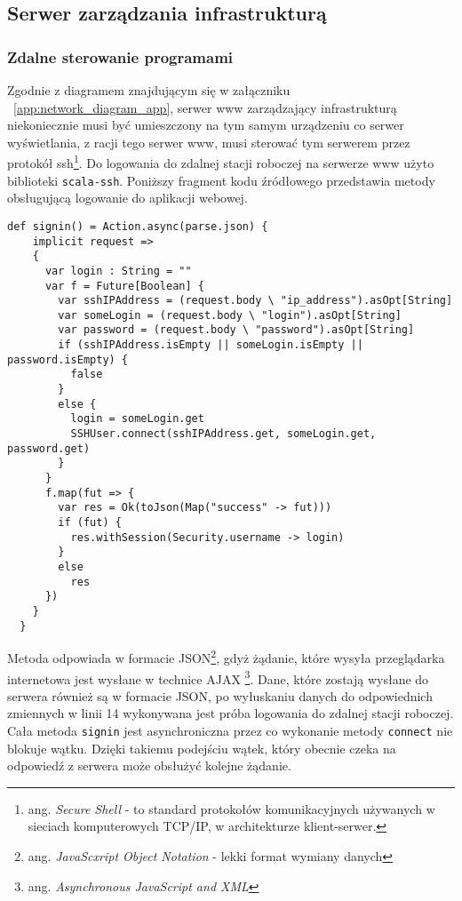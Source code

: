 \subsection{Serwer zarządzania infrastrukturą}

\subsubsection{Zdalne sterowanie programami}

Zgodnie z diagramem znajdującym się w załączniku ~\ref{app:network_diagram_app}, serwer www zarządzający infrastrukturą niekoniecznie musi być umieszczony na tym samym urządzeniu co serwer wyświetlania, z racji tego serwer www, musi sterować tym serwerem przez protokół ssh\footnote{ang. \emph{Secure Shell} - to standard protokołów komunikacyjnych używanych w sieciach komputerowych TCP/IP, w architekturze klient-serwer.\cite{ssh-wiki}}.
Do logowania do zdalnej stacji roboczej na serwerze www użyto biblioteki \lstinline{scala-ssh}. Poniższy fragment kodu źródłowego przedstawia metody obsługującą logowanie do aplikacji webowej.

\begin{lstlisting}
def signin() = Action.async(parse.json) {
    implicit request =>
    {
      var login : String = ""
      var f = Future[Boolean] {
        var sshIPAddress = (request.body \ "ip_address").asOpt[String]
        var someLogin = (request.body \ "login").asOpt[String]
        var password = (request.body \ "password").asOpt[String]
        if (sshIPAddress.isEmpty || someLogin.isEmpty || password.isEmpty) {
          false
        }
        else {
          login = someLogin.get
          SSHUser.connect(sshIPAddress.get, someLogin.get, password.get)
        }
      }
      f.map(fut => {
        var res = Ok(toJson(Map("success" -> fut)))
        if (fut) {
          res.withSession(Security.username -> login)
        }
        else
          res
      })
    }
  }
\end{lstlisting}

Metoda odpowiada w formacie JSON\footnote{ang. \emph{JavaScxript Object Notation} - lekki format wymiany danych}, gdyż żądanie, które wysyła przeglądarka internetowa jest wysłane w technice AJAX \footnote{ang. \emph{Asynchronous JavaScript and XML}}. Dane, które zostają wysłane do serwera również są w formacie JSON, po wyłuskaniu danych do odpowiednich zmiennych w linii 14 wykonywana jest próba logowania do zdalnej stacji roboczej. Cała metoda \lstinline{signin} jest asynchroniczna przez co wykonanie metody \lstinline{connect} nie blokuje wątku. Dzięki takiemu podejściu wątek, który obecnie czeka na odpowiedź z serwera może obsłużyć kolejne żądanie.

